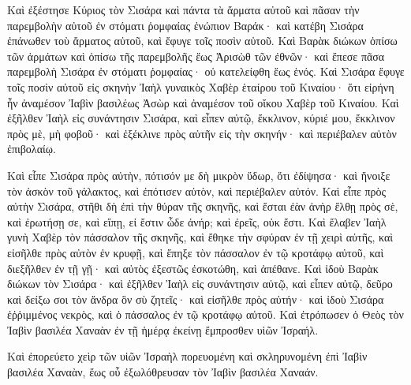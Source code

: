 {Καὶ ἐξέστησε Κύριος τὸν Σισάρα καὶ πάντα τὰ ἅρματα αὐτοῦ καὶ πᾶσαν τὴν παρεμβολὴν αὐτοῦ ἐν στόματι ῥομφαίας ἐνώπιον Βαράκ· καὶ κατέβη Σισάρα ἐπάνωθεν τοὺ ἄρματος αὐτοῦ, καὶ ἔφυγε τοῖς ποσὶν αὐτοῦ.
Καὶ Βαρὰκ διώκων ὀπίσω τῶν ἁρμάτων καὶ ὀπίσω τῆς παρεμβολῆς ἕως Ἀρισὼθ τῶν ἐθνῶν· καὶ ἔπεσε πᾶσα παρεμβολὴ Σισάρα ἐν στόματι ῥομφαίας· οὐ κατελείφθη ἕως ἑνός.
Καὶ Σισάρα ἔφυγε τοῖς ποσὶν αὐτοῦ εἰς σκηνὴν Ἰαὴλ γυναικὸς Χαβὲρ ἑταίρου τοῦ Κιναίου· ὅτι εἰρήνη ἦν ἀναμέσον Ἰαβὶν βασιλέως Ἀσὼρ καὶ ἀναμέσον τοῦ οἴκου Χαβὲρ τοῦ Κιναίου.
Καὶ ἐξῆλθεν Ἰαὴλ εἰς συνάντησιν Σισάρα, καὶ εἶπεν αὐτῷ, ἔκκλινον, κύριέ μου, ἔκκλινον πρὸς μὲ, μὴ φοβοῦ· καὶ ἐξέκλινε πρὸς αὐτῆν εἰς τὴν σκηνήν· καὶ περιέβαλεν αὐτὸν ἐπιβολαίῳ.
\par }{\PP {}Καὶ εἶπε Σισάρα πρὸς αὐτὴν, πότισόν με δὴ μικρὸν ὕδωρ, ὅτι ἐδίψησα· καὶ ἤνοιξε τὸν ἀσκὸν τοῦ γάλακτος, καὶ ἐπότισεν αὐτὸν, καὶ περιέβαλεν αὐτόν.
Καὶ εἶπε πρὸς αὐτὴν Σισάρα, στῆθι δὴ ἐπὶ τὴν θύραν τῆς σκηνῆς, καὶ ἔσται ἐὰν ἀνὴρ ἔλθῃ πρὸς σὲ, καὶ ἐρωτήσῃ σε, καὶ εἴπῃ, εἰ ἔστιν ὧδε ἀνήρ; καὶ ἐρεῖς, οὐκ ἔστι.
Καὶ ἔλαβεν Ἰαὴλ γυνὴ Χαβὲρ τὸν πάσσαλον τῆς σκηνῆς, καὶ ἔθηκε τὴν σφύραν ἐν τῇ χειρὶ αὐτῆς, καὶ εἰσῆλθε πρὸς αὐτὸν ἐν κρυφῇ, καὶ ἔπηξε τὸν πάσσαλον ἐν τῷ κροτάφῳ αὐτοῦ, καὶ διεξῆλθεν ἐν τῇ γῇ· καὶ αὐτὸς ἐξεστῶς ἐσκοτώθη, καὶ ἀπέθανε.
Καὶ ἰδοὺ Βαρὰκ διώκων τὸν Σισάρα· καὶ ἐξῆλθεν Ἰαὴλ εἰς συνάντησιν αὐτῷ, καὶ εἶπεν αὐτῷ, δεῦρο καὶ δείξω σοι τὸν ἄνδρα ὃν σὺ ζητεῖς· καὶ εἰσῆλθε πρὸς αὐτήν· καὶ ἰδοὺ Σισάρα ἐῤῥιμμένος νεκρὸς, καὶ ὁ πάσσαλος ἐν τῷ κροτάφῳ αὐτοῦ.
Καὶ ἐτρόπωσεν ὁ Θεὸς τὸν Ἰαβὶν βασιλέα Χαναὰν ἐν τῇ ἡμέρᾳ ἐκείνῃ ἔμπροσθεν υἱῶν Ἰσραήλ.
\par }{\PP {}Καὶ ἐπορεύετο χεὶρ τῶν υἱῶν Ἰσραὴλ πορευομένη καὶ σκληρυνομένη ἐπὶ Ἰαβὶν βασιλέα Χαναὰν, ἕως οὗ ἐξωλόθρευσαν τὸν Ἰαβὶν βασιλέα Χαναάν.

}
